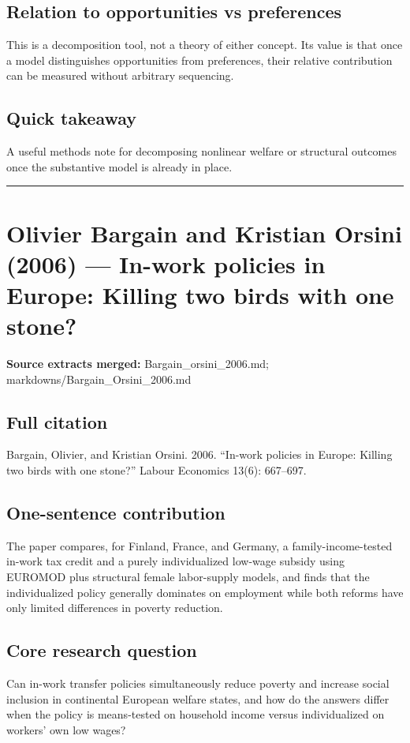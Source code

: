 \documentclass[11pt,a4paper]{article}
\begin{document}
\subsection*{Relation to opportunities vs preferences}
This is a decomposition tool, not a theory of either concept. Its value is that once a model distinguishes opportunities from preferences, their relative contribution can be measured without arbitrary sequencing.

\subsection*{Quick takeaway}
A useful methods note for decomposing nonlinear welfare or structural outcomes once the substantive model is already in place.


\medskip\hrule\medskip

\section*{Olivier Bargain and Kristian Orsini (2006) — In-work policies in Europe: Killing two birds with one stone?}

\textbf{Source extracts merged:} Bargain\_orsini\_2006.md; markdowns/Bargain\_Orsini\_2006.md

\subsection*{Full citation}
Bargain, Olivier, and Kristian Orsini. 2006. “In-work policies in Europe: Killing two birds with one stone?” Labour Economics 13(6): 667–697.

\subsection*{One-sentence contribution}
The paper compares, for Finland, France, and Germany, a family-income-tested in-work tax credit and a purely individualized low-wage subsidy using EUROMOD plus structural female labor-supply models, and finds that the individualized policy generally dominates on employment while both reforms have only limited differences in poverty reduction.

\subsection*{Core research question}
Can in-work transfer policies simultaneously reduce poverty and increase social inclusion in continental European welfare states, and how do the answers differ when the policy is means-tested on household income versus individualized on workers’ own low wages?
\end{document}
